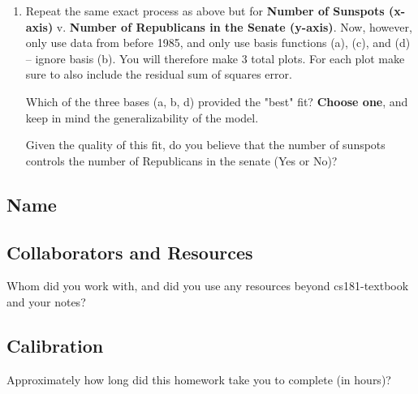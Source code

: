 \documentclass[submit]{harvardml}
\begin{document}
\begin{problem}
\begin{enumerate}
First, plot the data and regression lines for each of the following sets of basis functions, and include
the generated plot as an image in your submission PDF. You will therefore make 4 total plots:
\begin{enumerate}
	\item[(a)] $\phi_j(x) = x^j$ for $j=1, \ldots, 5$\\
    ie, use basis $y = a_1 x^1 + a_2 x^2 + a_3 x^3 + a_4 x^4 + a_5 x^5$ for some constants $\{a_1, ..., a_5\}$. 
    \item[(b)] $\phi_j(x) = \exp{\frac{-(x-\mu_j)^2}{25}}$ for $\mu_j=1960, 1965, 1970, 1975, \ldots 2010$
	\item[(c)] $\phi_j(x) = \cos(x / j)$ for $j=1, \ldots, 5$
	\item[(d)] $\phi_j(x) = \cos(x / j)$ for $j=1, \ldots, 25$
\end{enumerate}
\vspace{-2mm}
{\footnotesize * Note: Be sure to add a bias term for each of the basis functions above.}

Second, for each plot include the residual sum of squares error.

\item Repeat the same exact process as above but for \textbf{Number of Sunspots (x-axis)} v. \textbf{Number of Republicans in the Senate (y-axis)}. Now, however, only use data from before 1985, and only use basis functions (a), (c), and (d) -- ignore basis (b). You will therefore make 3 total plots. For each plot make sure to also include the residual sum of squares error.

Which of the three bases (a, b, d) provided the "best" fit? \textbf{Choose one}, and keep in mind the generalizability of the model. 

Given the quality of this fit, do you believe that the number of sunspots controls the number of Republicans in the senate (Yes or No)?

\end{enumerate}

\end{problem}



\newpage
\subsection*{Name}

\subsection*{Collaborators and Resources}
Whom did you work with, and did you use any resources beyond cs181-textbook and your notes?

\subsection*{Calibration}
Approximately how long did this homework take you to complete (in hours)? 
\end{document}
